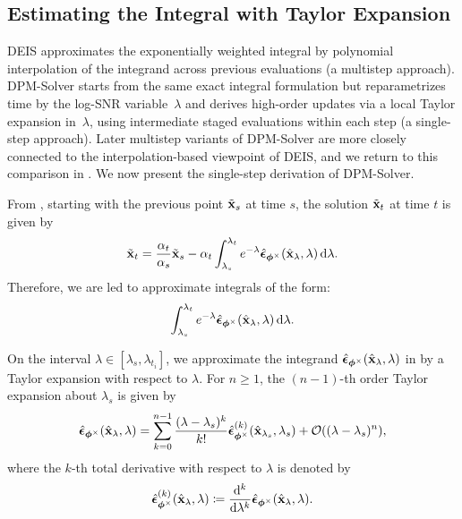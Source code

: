 \subsection{Estimating the Integral with Taylor Expansion}\label{subsec:dpm-method-2} 
DEIS approximates the exponentially weighted integral by polynomial
interpolation of the integrand across previous evaluations (a multistep
approach). DPM-Solver starts from the same exact integral formulation
but reparametrizes time by the log-SNR variable~$\lambda$ and derives
high-order updates via a local Taylor expansion in~$\lambda$, using
intermediate staged evaluations within each step (a single-step
approach). Later multistep variants of DPM-Solver are more closely connected to the interpolation-based viewpoint of DEIS, and we return to this comparison in . We now present the single-step derivation of DPM-Solver.



From , starting with the previous point $\tilde{{\mathbf{x}}}_{s}$ at time $s$, the solution $\tilde{{\mathbf{x}}}_{t} $ at time $t$ is given by
\begin{equation}
\label{eqn:analytic_solution_each_step}
    \tilde{{\mathbf{x}}}_{t}  = \frac{\alpha_{t}}{\alpha_{s}} \tilde{{\mathbf{x}}}_{s} - \alpha_{t} \int_{\lambda_{s}}^{\lambda_{t}} e^{-\lambda} \hat{\bm{\epsilon}}_{\bm{\phi}^\times}(\hat{{\mathbf{x}}}_{\lambda}, \lambda)\mathop{}\!\mathrm{d}\lambda.
\end{equation}
Therefore, we are led to approximate integrals of the form:
\begin{align*}
    \int_{\lambda_{s}}^{\lambda_{t}} e^{-\lambda} \hat{\bm{\epsilon}}_{\bm{\phi}^\times}(\hat{{\mathbf{x}}}_{\lambda}, \lambda)\mathop{}\!\mathrm{d}\lambda.
\end{align*}

On the interval $\lambda \in [\lambda_{s}, \lambda_{t_i}]$, we approximate the integrand $\hat{\bm{\epsilon}}_{\bm{\phi}^\times}(\hat{{\mathbf{x}}}_\lambda, \lambda)$ in  by a Taylor expansion with respect to $\lambda$. For $n \geq 1$, the $(n{-}1)$-th order Taylor expansion about $\lambda_{s}$ is given by
\begin{equation*}
    \hat{\bm{\epsilon}}_{\bm{\phi}^\times}(\hat{{\mathbf{x}}}_\lambda, \lambda)
    = \sum_{k=0}^{n-1} \frac{(\lambda - \lambda_{s})^k}{k!} 
    \hat{\bm{\epsilon}}_{\bm{\phi}^\times}^{(k)}(\hat{{\mathbf{x}}}_{\lambda_{s}}, \lambda_{s})
    + \mathcal{O}((\lambda - \lambda_{s})^n),
\end{equation*}
where the $k$-th total derivative with respect to $\lambda$ is denoted by
\[
\hat{\bm{\epsilon}}_{\bm{\phi}^\times}^{(k)}(\hat{{\mathbf{x}}}_\lambda, \lambda) 
\coloneqq \frac{\mathop{}\!\mathrm{d}^k}{\mathop{}\!\mathrm{d}\lambda^k} \hat{\bm{\epsilon}}_{\bm{\phi}^\times}(\hat{{\mathbf{x}}}_\lambda, \lambda).
\]

